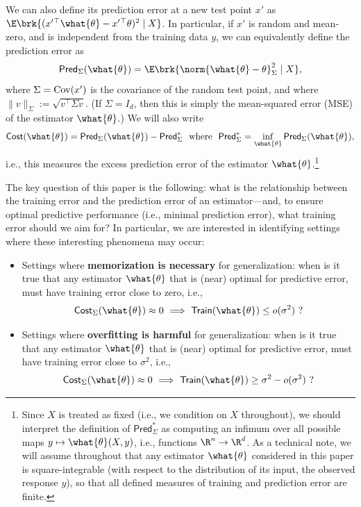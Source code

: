 \documentclass[11pt]{article}
\newcommand{\trerr}{\mathsf{Train}}
\newcommand{\prerr}{\mathsf{Pred}}
\newcommand{\cost}{\mathsf{Cost}}
\begin{document}
We can also define its prediction error at a new test point $x'$ as $\E\brk{(x'{}^\top\what{\theta} - x'{}^\top \theta)^2\mid X}$. In particular, if $x'$ is random and mean-zero, and is independent from the training data $y$, we can equivalently define the prediction error as
\[\prerr_\Sigma(\what{\theta}) = \E\brk{\norm{\what{\theta} - \theta}_{\Sigma}^2\mid X},\]
where $\Sigma = \textnormal{Cov}(x')$ is the covariance of the random test point, and where $\|v\|_{\Sigma}:=\sqrt{v^\top \Sigma v}$. (If $\Sigma = I_d$, then this is simply the mean-squared error (MSE) of the estimator $\what{\theta}$.)
We will also write
\[\cost(\what{\theta}) = \prerr_\Sigma(\what{\theta}) - \prerr_\Sigma^*\textnormal{ \ where \ }\prerr_\Sigma^* = \inf_{\what{\theta}} \prerr_\Sigma(\what{\theta}),\]
i.e., this measures the excess prediction error of the estimator $\what{\theta}$.\footnote{Since $X$ is treated as fixed (i.e., we condition on $X$ throughout), we should interpret the definition of $\prerr_\Sigma^*$ as computing an infimum over all possible maps $y\mapsto \what{\theta}(X,y)$, i.e., functions $\R^n\to\R^d$. As a technical note, we will assume throughout that any estimator $\what{\theta}$ considered in this paper is square-integrable (with respect to the distribution of its input, the observed response $y$), so that all defined measures of training and prediction error are finite.}

The key question of this paper is the following: what is the relationship between the training error and the prediction error of an estimator---and, to ensure optimal predictive performance (i.e., minimal prediction error), what training error should we aim for? 
In particular, we are interested in identifying settings where these interesting phenomena may occur:
\begin{itemize}
    \item Settings where \textbf{memorization is necessary} for generalization: when is it true that any estimator $\what{\theta}$ that is (near) optimal for predictive error, must have training error close to zero, i.e.,
    \[\cost_\Sigma(\what{\theta})\approx  0 \ \Longrightarrow \ \trerr(\what{\theta}) \leq o(\sigma^2) \ ?\]
    \item Settings where \textbf{overfitting is harmful} for generalization: when is it true that any estimator $\what{\theta}$ that is (near) optimal for predictive error, must have training error close to $\sigma^2$, i.e.,
    \[\cost_\Sigma(\what{\theta}) \approx 0 \ \Longrightarrow \ \trerr(\what{\theta}) \geq \sigma^2 - o(\sigma^2) \ ?\]
\end{itemize}
\end{document}
